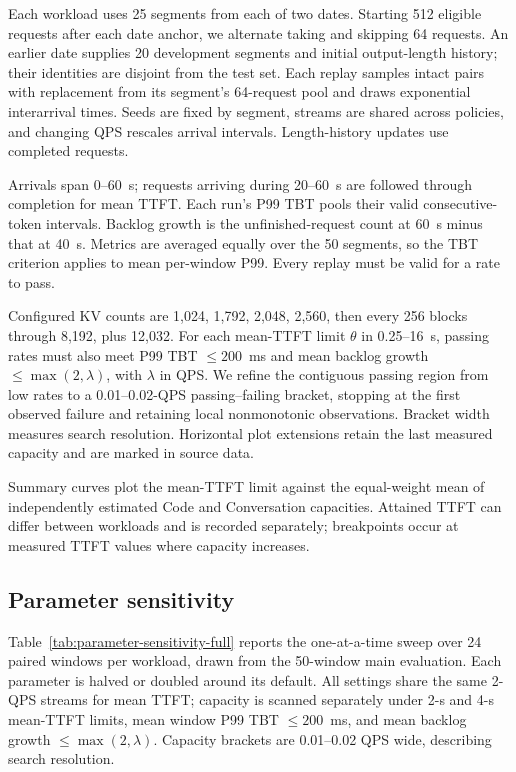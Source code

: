 Each workload uses 25 segments from each of two dates. Starting 512 eligible requests after each date anchor, we alternate taking and skipping 64 requests. An earlier date supplies 20 development segments and initial output-length history; their identities are disjoint from the test set. Each replay samples intact pairs with replacement from its segment's 64-request pool and draws exponential interarrival times. Seeds are fixed by segment, streams are shared across policies, and changing QPS rescales arrival intervals. Length-history updates use completed requests.

Arrivals span 0--60~s; requests arriving during 20--60~s are followed through completion for mean TTFT. Each run's P99 TBT pools their valid consecutive-token intervals. Backlog growth is the unfinished-request count at 60~s minus that at 40~s. Metrics are averaged equally over the 50 segments, so the TBT criterion applies to mean per-window P99. Every replay must be valid for a rate to pass.

Configured KV counts are 1,024, 1,792, 2,048, 2,560, then every 256 blocks through 8,192, plus 12,032. For each mean-TTFT limit $\theta$ in 0.25--16~s, passing rates must also meet P99 TBT $\le200$~ms and mean backlog growth $\le\max(2,\lambda)$, with $\lambda$ in QPS. We refine the contiguous passing region from low rates to a 0.01--0.02-QPS passing--failing bracket, stopping at the first observed failure and retaining local nonmonotonic observations. Bracket width measures search resolution. Horizontal plot extensions retain the last measured capacity and are marked in source data.

Summary curves plot the mean-TTFT limit against the equal-weight mean of independently estimated Code and Conversation capacities. Attained TTFT can differ between workloads and is recorded separately; breakpoints occur at measured TTFT values where capacity increases.

\subsection{Parameter sensitivity}
\label{app:parameter-sensitivity}

Table~\ref{tab:parameter-sensitivity-full} reports the one-at-a-time sweep over 24 paired windows per workload, drawn from the 50-window main evaluation. Each parameter is halved or doubled around its default. All settings share the same 2-QPS streams for mean TTFT; capacity is scanned separately under 2-s and 4-s mean-TTFT limits, mean window P99 TBT $\le200$~ms, and mean backlog growth $\le\max(2,\lambda)$. Capacity brackets are 0.01--0.02 QPS wide, describing search resolution.

